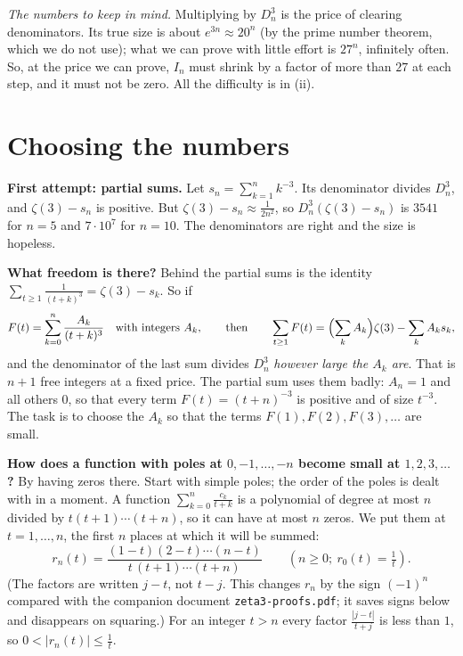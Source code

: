 \documentclass[11pt]{article}
\newcommand{\q}[1]{\medskip\noindent\textbf{#1}}
\begin{document}
\emph{The numbers to keep in mind.} Multiplying by $D_n^3$ is the price of clearing denominators.
Its true size is about $e^{3n}\approx20^n$ (by the prime number theorem, which we do not use); what
we can prove with little effort is $27^n$, infinitely often. So, at the price we can prove, $I_n$
must shrink by a factor of more than $27$ at each step, and it must not be zero. All the difficulty is in (ii).

\section{Choosing the numbers}

\q{First attempt: partial sums.} Let $s_n=\sum_{k=1}^nk^{-3}$. Its denominator divides $D_n^3$, and
$\zeta(3)-s_n$ is positive. But $\zeta(3)-s_n\approx\frac1{2n^2}$, so $D_n^3(\zeta(3)-s_n)$ is
$3541$ for $n=5$ and $7\cdot10^7$ for $n=10$. The denominators are right and the size is hopeless.

\q{What freedom is there?} Behind the partial sums is the identity
$\sum_{t\ge1}\frac1{(t+k)^3}=\zeta(3)-s_k$. So if
\[
F(t)=\sum_{k=0}^n\frac{A_k}{(t+k)^3}\quad\text{with integers }A_k,\qquad\text{then}\qquad
\sum_{t\ge1}F(t)=\Bigl(\sum_kA_k\Bigr)\zeta(3)-\sum_kA_ks_k ,
\]
and the denominator of the last sum divides $D_n^3$ \emph{however large the $A_k$ are}. That is
$n+1$ free integers at a fixed price. The partial sum uses them badly: $A_n=1$ and all others $0$,
so that every term $F(t)=(t+n)^{-3}$ is positive and of size $t^{-3}$. The task is to choose the
$A_k$ so that the terms $F(1),F(2),F(3),\dots$ are small.

\q{How does a function with poles at $0,-1,\dots,-n$ become small at $1,2,3,\dots$?} By having
zeros there. Start with simple poles; the order of the poles is dealt with in a moment. A function
$\sum_{k=0}^n\frac{c_k}{t+k}$ is a polynomial of degree at most $n$ divided by $t(t+1)\cdots(t+n)$,
so it can have at most $n$ zeros. We put them at $t=1,\dots,n$, the first $n$ places at which it
will be summed:
\[
r_n(t)=\frac{(1-t)(2-t)\cdots(n-t)}{t\,(t+1)\cdots(t+n)}\qquad(n\ge0;\ r_0(t)=\tfrac1t).
\]
(The factors are written $j-t$, not $t-j$. This changes $r_n$ by the sign $(-1)^n$ compared with the
companion document \texttt{zeta3-proofs.pdf}; it saves signs below and disappears on squaring.) For
an integer $t>n$ every factor $\frac{|j-t|}{t+j}$ is less than $1$, so $0<|r_n(t)|\le\frac1t$.
\end{document}
